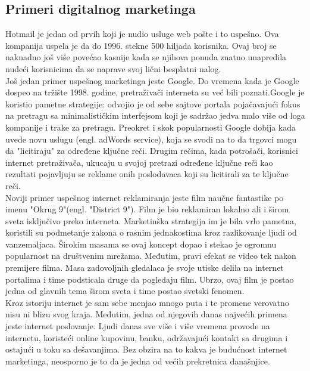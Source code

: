 \documentclass[a4paper]{article}
\begin{document}
{\subsection{Primeri digitalnog marketinga }
\label{subsec:primeri}
 Hotmail je jedan od prvih koji je nudio usluge web pošte i to uspešno. Ova kompanija uspela je da do 1996. stekne 500 hiljada korisnika. Ovaj broj se naknadno još više povećao kasnije kada se njihova ponuda znatno unapredila nudeći korisnicima da se naprave svoj lični besplatni nalog.\\
Još jedan primer uspešnog marketinga jeste Google. Do vremena kada je Google dospeo na tržište 1998. godine, pretraživači interneta su već bili poznati.Google je koristio pametne strategije: odvojio je od sebe sajtove portala pojačavajući fokus na pretragu sa minimalističkim interfejsom koji je sadržao jedva malo više od loga kompanije i trake za pretragu. Preokret i skok popularnosti Google dobija kada uvede novu uslugu (engl. adWords service), koja se svodi na to da trgovci mogu da "licitiraju" za određene ključne reči. Drugim rečima, kada potrošači, korisnici internet pretraživača, ukucaju u svojoj pretrazi određene ključne reči kao rezultati pojavljuju se reklame onih poslodavaca koji su licitirali za te ključne reči.\\
Noviji primer uspešnog internet reklamiranja jeste film naučne fantastike po imenu "Okrug 9"(engl. "District 9"). Film je bio reklamiran lokalno ali i širom sveta isključivo preko interneta. Marketinška strategija im je bila vrlo pametna, koristili su podmetanje zakona o rasnim jednakostima kroz razlikovanje ljudi od vanzemaljaca. Širokim masama se ovaj koncept dopao i stekao je ogromnu popularnost na društvenim mrežama. Međutim, pravi efekat se video tek nakon premijere filma. Masa zadovoljnih gledalaca je svoje utiske delila na internet portalima i time podsticala druge da pogledaju film. Ubrzo, ovaj film je postao jedna od glavnih tema širom sveta i time postao svetski fenomen.\\

Kroz istoriju internet je sam sebe menjao mnogo puta i te promene verovatno nisu ni blizu svog kraja. Međutim, jedna od njegovih danas najvećih primena jeste internet poslovanje. Ljudi danas sve više i više vremena provode na internetu, koristeći online kupovinu, banku, održavajući kontakt sa drugima i ostajući u toku sa dešavanjima. Bez obzira na to kakva je budućnost internet marketinga, neosporno je to da je jedna od većih prekretnica današnjice.\cite{istorija}

}
\end{document}
